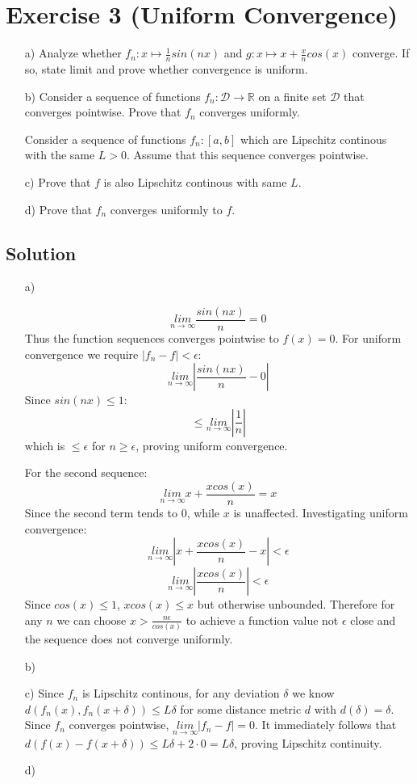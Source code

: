 \documentclass[10pt]{article}
\numberwithin{equation}{section}
\newcommand{\limn}{\underset{n\rightarrow \infty}{lim}}
\begin{document}
\section*{Exercise 3 (Uniform Convergence)}
\begin{enumerate}
\item[a)]{
    Analyze whether $f_n: x\mapsto \frac{1}{n}sin(nx)$ and $g: x \mapsto x + \frac{x}{n}cos(x)$ converge. If so, state limit and prove whether convergence is uniform.
  }
\item[b)]{
    Consider a sequence of functions $f_n: \mathcal{D} \rightarrow \mathbb{R}$ on a finite set $\mathcal{D}$ that converges pointwise. Prove that $f_n$ converges uniformly.
  }


\vspace{0.5cm}
  \hspace{-0.8cm}
  Consider a sequence of functions $f_n: [a,b]$ which are Lipschitz continous with the same $L > 0$. Assume that this sequence converges pointwise.
\item[c)]{
    Prove that $f$ is also Lipschitz continous with same $L$.
  }
\item[d)]{
    Prove that $f_n$ converges uniformly to $f$.
  }
\end{enumerate}


\subsection*{Solution}
\begin{enumerate}
\item[a)]{
    $$\limn \frac{sin(nx)}{n} = 0$$
    Thus the function sequences converges pointwise to $f(x) = 0$.
    For uniform convergence we require $|f_n - f| < \epsilon$:
    $$\limn |\frac{sin(nx)}{n} - 0|$$
    Since $sin(nx) \leq 1$:
    $$ \leq \limn |\frac{1}{n}|$$
    which is $\leq \epsilon$ for $n\geq \epsilon$, proving uniform convergence.

    For the second sequence:
    $$\limn x + \frac{x cos(x)}{n} = x$$
    Since the second term tends to 0, while $x$ is unaffected.
    Investigating uniform convergence:
    $$\limn |x + \frac{x cos(x)}{n} - x| < \epsilon$$
    $$\limn |\frac{x cos(x)}{n}| < \epsilon$$
    Since $cos(x) \leq 1$, $x cos(x) \leq x$ but otherwise unbounded. Therefore for any $n$ we can choose $x > \frac{n\epsilon}{cos(x)}$ to achieve a function value not $\epsilon$ close and the sequence does not converge uniformly.

  }
\item[b)]{
  }
\item[c)]{
    Since $f_n$ is Lipschitz continous, for any deviation $\delta$ we know $d(f_n(x), f_n(x+\delta)) \leq L\delta$ for some distance metric $d$ with $d(\delta) = \delta$.
    Since $f_n$ converges pointwise, $\limn |f_n - f| = 0$.
    It immediately follows that $d(f(x) - f(x+\delta)) \leq L\delta + 2\cdot 0 = L\delta$, proving Lipschitz continuity.
  }
\item[d)]{
  }
\end{enumerate}
\end{document}
